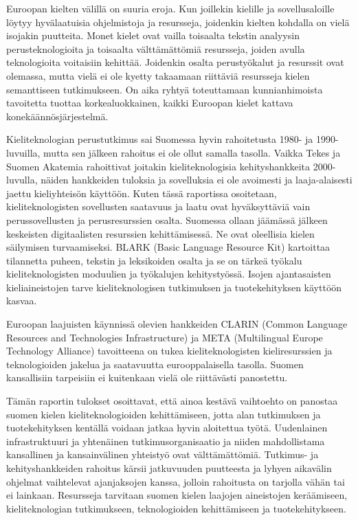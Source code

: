 \documentclass[]{../../metanetpaper}
\begin{document}
\begin{Parallel}[c]{70mm}{70mm}
{Euroopan kielten välillä on suuria eroja. Kun joillekin kielille ja
sovellusaloille löytyy hyvälaatuisia ohjelmistoja ja resursseja,
joidenkin kielten kohdalla on vielä isojakin puutteita. Monet kielet
ovat vailla toisaalta tekstin analyysin perusteknologioita ja
toisaalta välttämättömiä resursseja, joiden avulla teknologioita
voitaisiin kehittää. Joidenkin osalta perustyökalut ja resurssit ovat
olemassa, mutta vielä ei ole kyetty takaamaan riittäviä resursseja
kielen semanttiseen tutkimukseen. On aika ryhtyä toteuttamaan
kunnianhimoista tavoitetta tuottaa korkealuokkainen, kaikki Euroopan
kielet kattava konekäännösjärjestelmä.

Kieliteknologian perustutkimus sai Suomessa hyvin rahoitetusta 1980-
ja 1990-luvuilla, mutta sen jälkeen rahoitus ei ole ollut samalla
tasolla. Vaikka Tekes ja Suomen Akatemia rahoittivat joitakin
kieliteknologisia kehityshankkeita 2000-luvulla, näiden hankkeiden
tuloksia ja sovelluksia ei ole avoimesti ja laaja-alaisesti jaettu
kieliyhteisön käyttöön. Kuten tässä raportissa osoitetaan,
kieliteknologisten sovellusten saatavuus ja laatu ovat hyväksyttäviä
vain perussovellusten ja perusresurssien osalta. Suomessa ollaan
jäämässä jälkeen keskeisten digitaalisten resurssien
kehittämisessä. Ne ovat oleellisia kielen säilymisen
turvaamiseksi. BLARK (Basic Language Resource Kit) kartoittaa
tilannetta puheen, tekstin ja leksikoiden osalta ja se on tärkeä
työkalu kieliteknologisten moduulien ja työkalujen
kehitystyössä. Isojen ajantasaisten kieliaineistojen tarve
kieliteknologisen tutkimuksen ja tuotekehityksen käyttöön kasvaa.

Euroopan laajuisten käynnissä olevien hankkeiden CLARIN (Common
Language Resources and Technologies Infrastructure) ja META
(Multilingual Europe Technology Alliance) tavoitteena on tukea
kieliteknologisten kieliresurssien ja teknologioiden jakelua ja
saatavuutta eurooppalaisella tasolla. Suomen kansallisiin tarpeisiin
ei kuitenkaan vielä ole riittävästi panostettu.

Tämän raportin tulokset osoittavat, että ainoa kestävä vaihtoehto on
panostaa suomen kielen kieliteknologioiden kehittämiseen, jotta alan
tutkimuksen ja tuotekehityksen kentällä voidaan jatkaa hyvin
aloitettua työtä. Uudenlainen infrastruktuuri ja yhtenäinen
tutkimusorganisaatio ja niiden mahdollistama kansallinen ja
kansainvälinen yhteistyö ovat välttämättömiä. Tutkimus- ja
kehityshankkeiden rahoitus kärsii jatkuvuuden puutteesta ja lyhyen
aikavälin ohjelmat vaihtelevat ajanjaksojen kanssa, jolloin rahoitusta
on tarjolla vähän tai ei lainkaan. Resursseja tarvitaan suomen kielen
laajojen aineistojen keräämiseen, kieliteknologian tutkimukseen,
teknologioiden kehittämiseen ja tuotekehitykseen.

}
\end{Parallel}
\end{document}
